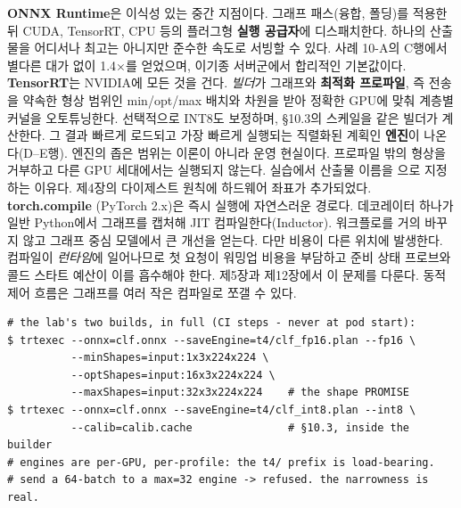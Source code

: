 \textbf{ONNX Runtime}은 이식성 있는 중간 지점이다. 그래프 패스(융합, 폴딩)를 적용한 뒤 CUDA, TensorRT, CPU 등의 플러그형 \textbf{실행 공급자}에 디스패치한다. 하나의 산출물을 어디서나 최고는 아니지만 준수한 속도로 서빙할 수 있다. 사례 10-A의 C행에서 별다른 대가 없이 1.4×를 얻었으며, 이기종 서버군에서 합리적인 기본값이다. \textbf{TensorRT}는 NVIDIA에 모든 것을 건다. \textit{빌더}가 그래프와 \textbf{최적화 프로파일}, 즉 전송을 약속한 형상 범위인 min/opt/max 배치와 차원을 받아 정확한 GPU에 맞춰 계층별 커널을 오토튜닝한다. 선택적으로 INT8도 보정하며, §10.3의 스케일을 같은 빌더가 계산한다. 그 결과 빠르게 로드되고 가장 빠르게 실행되는 직렬화된 계획인 \textbf{엔진}이 나온다(D–E행). 엔진의 좁은 범위는 이론이 아니라 운영 현실이다. 프로파일 밖의 형상을 거부하고 다른 GPU 세대에서는 실행되지 않는다. 실습에서 산출물 이름을 으로 지정하는 이유다. 제4장의 다이제스트 원칙에 하드웨어 좌표가 추가되었다. \textbf{torch.compile} (PyTorch 2.x)은 즉시 실행에 자연스러운 경로다. 데코레이터 하나가 일반 Python에서 그래프를 캡처해 JIT 컴파일한다(Inductor). 워크플로를 거의 바꾸지 않고 그래프 중심 모델에서 큰 개선을 얻는다. 다만 비용이 다른 위치에 발생한다. 컴파일이 \textit{런타임}에 일어나므로 첫 요청이 워밍업 비용을 부담하고 준비 상태 프로브와 콜드 스타트 예산이 이를 흡수해야 한다. 제5장과 제12장에서 이 문제를 다룬다. 동적 제어 흐름은 그래프를 여러 작은 컴파일로 쪼갤 수 있다.

\begin{terminalbox}
\begin{Verbatim}[breaklines=true,breakanywhere=true,fontsize=\small,formatcom=\color{tbbtermfg},codes=\tbbcodeactive]
# the lab's two builds, in full (CI steps - never at pod start):
$ trtexec --onnx=clf.onnx --saveEngine=t4/clf_fp16.plan --fp16 \
          --minShapes=input:1x3x224x224 \
          --optShapes=input:16x3x224x224 \
          --maxShapes=input:32x3x224x224    # the shape PROMISE
$ trtexec --onnx=clf.onnx --saveEngine=t4/clf_int8.plan --int8 \
          --calib=calib.cache               # §10.3, inside the builder
# engines are per-GPU, per-profile: the t4/ prefix is load-bearing.
# send a 64-batch to a max=32 engine -> refused. the narrowness is real.
\end{Verbatim}
\end{terminalbox}

